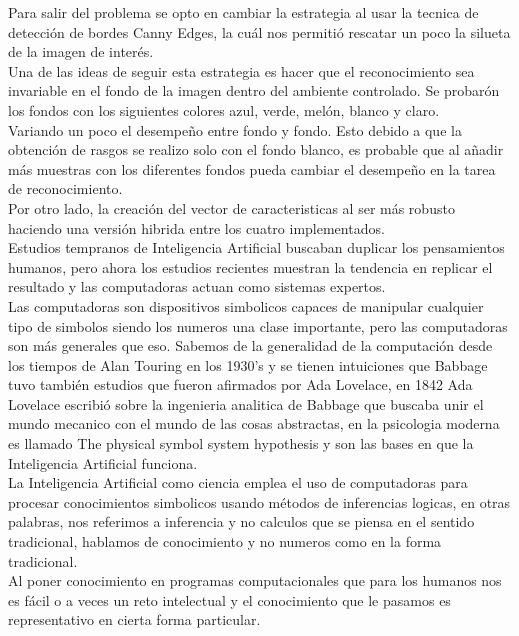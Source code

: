 \documentclass[a4paper, 11pt]{article}
\begin{document}
Para salir del problema se opto en cambiar la estrategia al usar la tecnica de detección de bordes Canny Edges, la cuál nos permitió rescatar un poco la silueta de la imagen de interés.\\

Una de las ideas de seguir esta estrategia es hacer que el reconocimiento sea invariable en el fondo de la imagen dentro del ambiente controlado. Se probarón los fondos con los siguientes colores azul, verde, melón, blanco y claro.\\

Variando un poco el desempeño entre fondo y fondo. Esto debido a que la obtención de rasgos se realizo solo con el fondo blanco, es probable que al añadir más muestras con los diferentes fondos pueda cambiar el desempeño en la tarea de reconocimiento.\\

Por otro lado, la creación del vector de caracteristicas al ser más robusto haciendo una versión hibrida entre los cuatro implementados.\\

Estudios tempranos de Inteligencia Artificial buscaban duplicar los pensamientos humanos, pero ahora los estudios recientes muestran la tendencia en replicar el resultado y las computadoras actuan como sistemas expertos.\\

Las computadoras son dispositivos simbolicos capaces de manipular cualquier tipo de simbolos siendo los numeros una clase importante, pero las computadoras son más generales que eso. Sabemos de la generalidad de la computación desde los tiempos de Alan Touring en los 1930's y se tienen intuiciones que Babbage tuvo también estudios que fueron afirmados por Ada Lovelace, en 1842 Ada Lovelace escribió sobre la ingenieria analitica de Babbage que buscaba unir el mundo mecanico con el mundo de las cosas abstractas, en la psicologia moderna es llamado The physical symbol system hypothesis y son las bases en que la Inteligencia Artificial funciona.\\

La Inteligencia Artificial como ciencia emplea el uso de computadoras para procesar conocimientos simbolicos usando métodos de inferencias logicas, en otras palabras, nos referimos a inferencia y no calculos que se piensa en el sentido tradicional, hablamos de conocimiento y no numeros como en la forma tradicional.\\
Al poner conocimiento en programas computacionales que para los humanos nos es fácil o a veces un reto intelectual y el conocimiento que le pasamos es representativo en cierta forma particular.\\
\end{document}
